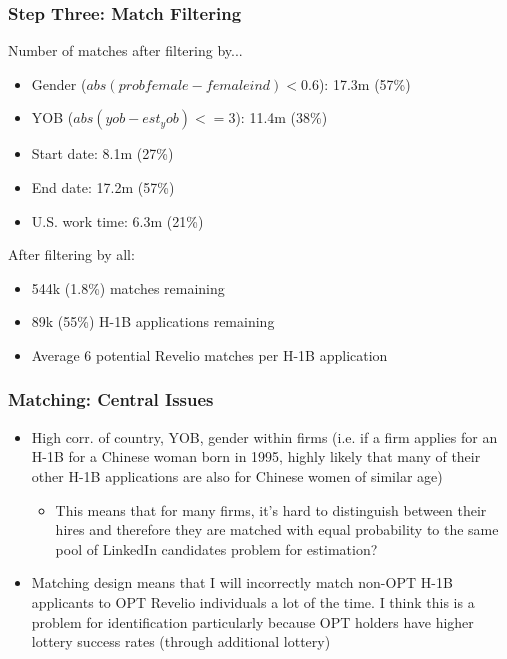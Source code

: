 \documentclass[xcolor=dvipsnames, compress, 12pt, aspectratio=169, handout]{beamer}
\begin{document}
\begin{frame}
    \frametitle{Step Three: Match Filtering}
    Number of matches after filtering by...
    \begin{itemize}
        \item Gender ($abs(prob female - female ind) < 0.6$): 17.3m (57\%)
        \item YOB ($abs(yob - est_yob) <= 3$): 11.4m (38\%)
        \item Start date: 8.1m (27\%)
        \item End date: 17.2m (57\%)
        \item U.S. work time: 6.3m (21\%)
    \end{itemize}
    After filtering by all:
    \begin{itemize}
        \item 544k (1.8\%) matches remaining
        \item 89k (55\%) H-1B applications remaining 
        \item Average 6 potential Revelio matches per H-1B application
    \end{itemize}
\end{frame}

\begin{frame}
    \frametitle{Matching: Central Issues}
    \begin{itemize}
        \item High corr. of country, YOB, gender within firms (i.e. if a firm applies for an H-1B for a Chinese woman born in 1995, highly likely that many of their other H-1B applications are also for Chinese women of similar age)
        \begin{itemize}
            \item This means that for many firms, it's hard to distinguish between their hires and therefore they are matched with equal probability to the same pool of LinkedIn candidates \textemdash problem for estimation?
        \end{itemize}
        \item Matching design means that I will incorrectly match non-OPT H-1B applicants to OPT Revelio individuals a lot of the time. I think this is a problem for identification particularly because OPT holders have higher lottery success rates (through additional lottery)
    \end{itemize}
\end{frame}
\end{document}
